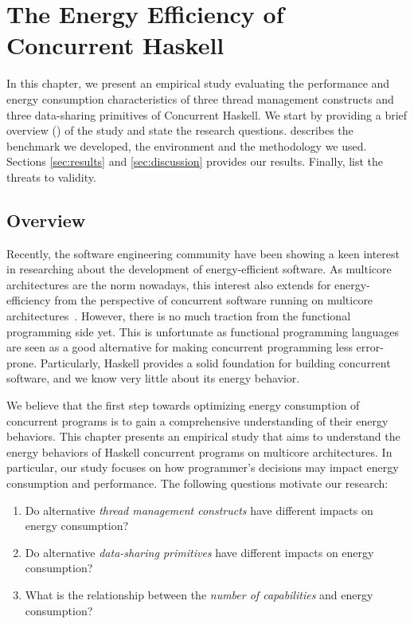 \chapter{The Energy Efficiency of Concurrent Haskell}\label{chp:study}
In this chapter, we present an empirical study evaluating the performance and energy consumption characteristics of three thread management constructs and three data-sharing primitives of Concurrent Haskell. We start by providing a brief overview () of the study and state the research questions.  describes the benchmark we developed, the environment and the methodology we used. Sections \ref{sec:results} and \ref{sec:discussion} provides our results. Finally,  list the threats to validity.

\section{Overview}\label{sec:overview}
Recently, the software engineering community have been showing a keen interest in researching about the development of energy-efficient software. As multicore architectures are the norm nowadays, this interest also extends for energy-efficiency from the perspective of concurrent software running on multicore architectures~\cite{trefethen:2013,ribic:2014, pinto:2014}. However, there is no much traction from the functional programming side yet. This is unfortunate as functional programming languages are seen as a good alternative for making concurrent programming less error-prone. %
Particularly, Haskell provides a solid foundation for building concurrent software, and we know very little about its energy behavior.

We believe that the first step towards optimizing energy consumption of concurrent programs is to gain a comprehensive understanding of their energy behaviors. This chapter presents an empirical study that aims to understand the energy behaviors of Haskell concurrent programs on multicore architectures. In particular, our study focuses on how programmer's decisions may impact energy consumption and performance. The following questions motivate our research:

\begin{enumerate}[label=\RQ{\arabic*}.]
  \item Do alternative \textit{thread management constructs} have different impacts on energy consumption?
  \item Do alternative \textit{data-sharing primitives} have different impacts on energy consumption?
  \item What is the relationship between the \textit{number of capabilities} and energy consumption?
\end{enumerate}

